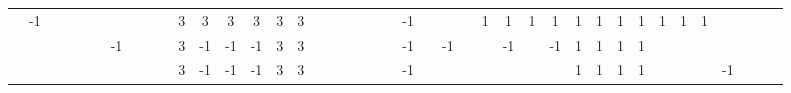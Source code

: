 \begin{table}[H]
{\begin{tabular}{ccccccccccccccccccccccccccccccccccccccccc}
   & -1 &                           &                           &                           &                           &                           &                           &                           &                           & \cellcolor[HTML]{3531FF}3 & \cellcolor[HTML]{3531FF}3 & \cellcolor[HTML]{3531FF}3 & \cellcolor[HTML]{3531FF}3 & \cellcolor[HTML]{3531FF}3 & \cellcolor[HTML]{3531FF}3 &                           &                           &                           &                           &                           &                           & -1                        &    &    &    & \cellcolor[HTML]{329A9D}1 & \cellcolor[HTML]{329A9D}1 & \cellcolor[HTML]{329A9D}1 & \cellcolor[HTML]{329A9D}1 & \cellcolor[HTML]{329A9D}1 & \cellcolor[HTML]{329A9D}1 & \cellcolor[HTML]{329A9D}1 & \cellcolor[HTML]{329A9D}1 & \cellcolor[HTML]{329A9D}1 & \cellcolor[HTML]{329A9D}1 & \cellcolor[HTML]{329A9D}1 &                           &  &  &  \\
   &    &                           &                           &                           &                           & -1                        &                           &                           &                           & \cellcolor[HTML]{3531FF}3 & -1                        & -1                        & -1                        & \cellcolor[HTML]{3531FF}3 & \cellcolor[HTML]{3531FF}3 &                           &                           &                           &                           &                           &                           & -1                        &    & -1 &    &                           & -1                        &                           & -1                        & \cellcolor[HTML]{329A9D}1 & \cellcolor[HTML]{329A9D}1 & \cellcolor[HTML]{329A9D}1 & \cellcolor[HTML]{329A9D}1 &                           &                           &                           &                           &  &  &  \\
   &    &                           &                           &                           &                           &                           &                           &                           &                           & \cellcolor[HTML]{3531FF}3 & -1                        & -1                        & -1                        & \cellcolor[HTML]{3531FF}3 & \cellcolor[HTML]{3531FF}3 &                           &                           &                           &                           &                           &                           & -1                        &    &    &    &                           &                           &                           &                           & \cellcolor[HTML]{329A9D}1 & \cellcolor[HTML]{329A9D}1 & \cellcolor[HTML]{329A9D}1 & \cellcolor[HTML]{329A9D}1 &                           &                           &                           & -1                        &  &  &  \\

\end{tabular}}
\end{table}
